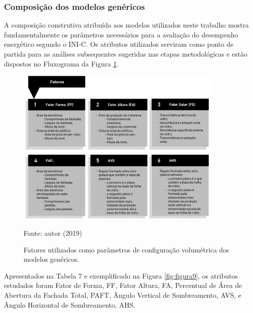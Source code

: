 \subsubsection{Composição dos modelos genéricos}
A composição construtiva atribuída aos modelos utilizados neste trabalho mostra fundamentalmente os parâmetros necessários para a avaliação do desempenho energético segundo o INI-C. Os atributos utilizados serviram como ponto de partida para as análises subsequentes sugeridas nas etapas metodológicas e estão dispostos no Fluxograma da Figura \ref{fig:figura8}.\vspace{-0.10cm}%
    \begin{figure}[H]
        \centering
        \caption{Fatores utilizados como parâmetros de configuração volumétrica dos modelos genéricos.}
        \includegraphics[width=0.9\textwidth]{figures/fig10_Fluxogramas-2.jpg}
        \begin{flushleft}
            \par \small Fonte: autor (2019)
        \end{flushleft}
        \label{fig:figura8}
    \end{figure}
\pagebreak
\noindent Apresentados na Tabela 7 e exemplificado na Figura \ref{fig:figura9}, os atributos estudados foram Fator de Forma, FF, Fator Altura, FA, Percentual de Área de Abertura da Fachada Total, PAFT, Ângulo Vertical de Sombreamento, AVS, e Ângulo Horizontal de Sombreamento, AHS.%
